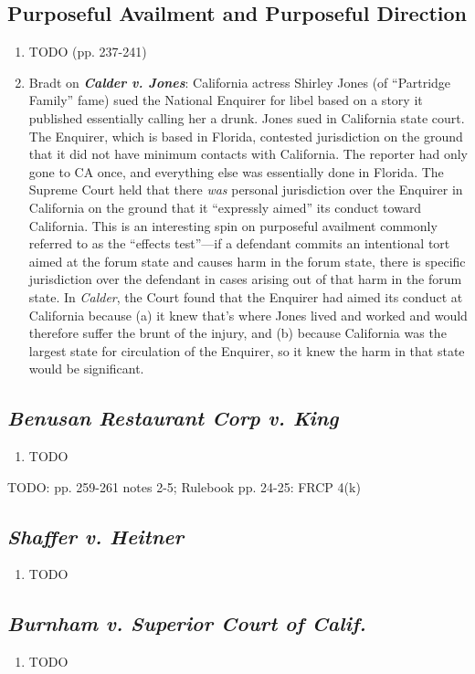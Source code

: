 \subsection{Purposeful Availment and Purposeful Direction}

\begin{enumerate}
    \item TODO (pp. 237-241)
    \item Bradt on \textbf{\emph{Calder v. Jones}}: California actress Shirley Jones (of ``Partridge Family'' fame) sued the National Enquirer for libel based on a story it published essentially calling her a drunk.  Jones sued in California state court.  The Enquirer, which is based in Florida, contested jurisdiction on the ground that it did not have minimum contacts with California.  The reporter had only gone to CA once, and everything else was essentially done in Florida.  The Supreme Court held that there \emph{was} personal jurisdiction over the Enquirer in California on the ground that it ``expressly aimed'' its conduct toward California.  This is an interesting spin on purposeful availment commonly referred to as the ``effects test''---if a defendant commits an intentional tort aimed at the forum state and causes harm in the forum state, there is specific jurisdiction over the defendant in cases arising out of that harm in the forum state.  In \emph{Calder}, the Court found that the Enquirer had aimed its conduct at California because (a) it knew that's where Jones lived and worked and would therefore suffer the brunt of the injury, and (b) because California was the largest state for circulation of the Enquirer, so it knew the harm in that state would be significant.  
\end{enumerate}

\subsection{\emph{Benusan Restaurant Corp v. King}}

\begin{enumerate}
    \item TODO
\end{enumerate}

TODO: pp. 259-261 notes 2-5; Rulebook pp. 24-25: FRCP 4(k)

\subsection{\emph{Shaffer v. Heitner}}

\begin{enumerate}
    \item TODO
\end{enumerate}

\subsection{\emph{Burnham v. Superior Court of Calif.}}

\begin{enumerate}
    \item TODO
\end{enumerate}

